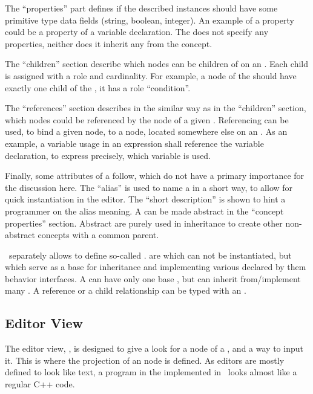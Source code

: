 The ``properties'' part defines if the described  instances should have some primitive type data fields (string, boolean, integer).
An example of a property could be a  property of a variable declaration. The   does not specify any 
properties, neither does it inherit any from the  concept.

The ``children'' section describe which nodes can be children of  on an . Each child is assigned with a role and cardinality. 
For example, a node of the   should have exactly one child of the  , 
it has a role ``condition''.

The ``references'' section describes in the similar way as in the ``children'' section, which nodes could be referenced by the node of a given .
Referencing can be used, to bind a given node, to a node, located somewhere else on an . As an example, a variable usage in an expression shall reference
the variable declaration, to express precisely, which variable is used.

Finally, some attributes of a  follow, which do not have a primary importance for the discussion here. The ``alias'' is used to 
name a  in a short way, to allow for quick instantiation in the editor. The ``short description'' is shown to hint a programmer on the
alias meaning. A  can be made abstract in the ``concept properties'' section. Abstract  are purely used in inheritance 
to create other non-abstract concepts with a common parent.

\jbmps\ separately allows to define so-called .  are  which can not be instantiated, but 
which serve as a base for inheritance and implementing various declared by them behavior interfaces. A  can have only one base ,
but can inherit from/implement many . A reference or a child relationship can be typed with an .

\subsection{Editor View}
\label{mpseditor}



The editor view, , is designed to give a look for a node of a , and a way to input it. This is where the projection of an  node is defined. 
As editors are mostly defined to look like text, a program in the \cpppl implemented in \jbmps\ looks almost like a regular C++ code.

